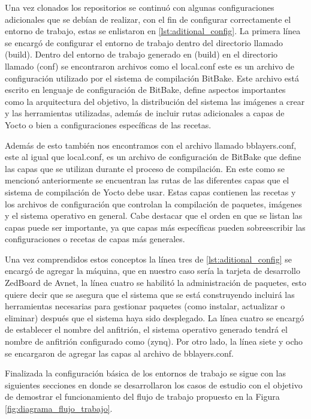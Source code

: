 Una vez clonados los repositorios se continuó con algunas configuraciones adicionales que se debían de realizar, con el fin de configurar correctamente el entorno de trabajo, estas se enlistaron en \ref{lst:aditional_config}. La primera línea se encargó de configurar el entorno de trabajo dentro del directorio llamado (build). Dentro del entorno de trabajo generado en (build) en el directorio llamado (conf) se encontraron archivos como el local.conf este es un archivo de configuración utilizado por el sistema de compilación BitBake. Este archivo está escrito en lenguaje de configuración de BitBake, define aspectos importantes como la arquitectura del objetivo, la distribución del sistema las imágenes a crear y las herramientas utilizadas, además de incluir rutas adicionales a capas de Yocto o bien a configuraciones específicas de las recetas. 

Además de esto también nos encontramos con el archivo llamado bblayers.conf, este al igual que local.conf, es un archivo de configuración de BitBake que define las capas que se utilizan durante el proceso de compilación. En este como se mencionó anteriormente se encuentran las rutas de las diferentes capas que el sistema de compilación de Yocto debe usar. Estas capas contienen las recetas y los archivos de configuración que controlan la compilación de paquetes, imágenes y el sistema operativo en general. Cabe destacar que el orden en que se listan las capas puede ser importante, ya que capas más específicas pueden sobreescribir las configuraciones o recetas de capas más generales.

Una vez comprendidos estos conceptos la línea tres de \ref{lst:aditional_config} se encargó de agregar la máquina, que en nuestro caso sería la tarjeta de desarrollo ZedBoard de Avnet, la línea cuatro se habilitó la administración de paquetes, esto quiere decir que se asegura que el sistema que se está construyendo incluirá las herramientas necesarias para gestionar paquetes (como instalar, actualizar o eliminar) después que el sistema haya sido desplegado. La línea cuatro se encargó de establecer el nombre del anfitrión, el sistema operativo generado tendrá el nombre de anfitrión configurado como (zynq). Por otro lado, la línea siete y ocho se encargaron de agregar las capas al archivo de bblayers.conf.

Finalizada la configuración básica de los entornos de trabajo se sigue con las siguientes secciones en donde se desarrollaron los casos de estudio con el objetivo de demostrar el funcionamiento del flujo de trabajo propuesto en la Figura \ref{fig:diagrama_flujo_trabajo}.

